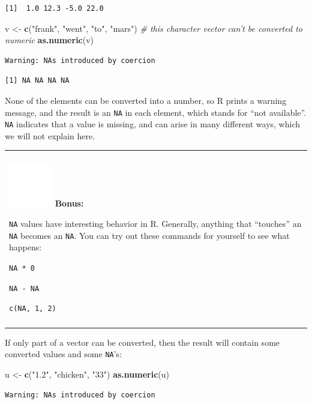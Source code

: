\documentclass[
]{book}
\newenvironment{Shaded}{\begin{snugshade}}{\end{snugshade}}
\newcommand{\CommentTok}[1]{\textcolor[rgb]{0.56,0.35,0.01}{\textit{#1}}}
\newcommand{\KeywordTok}[1]{\textcolor[rgb]{0.13,0.29,0.53}{\textbf{#1}}}
\newcommand{\NormalTok}[1]{#1}
\newcommand{\StringTok}[1]{\textcolor[rgb]{0.31,0.60,0.02}{#1}}
\newenvironment{bonus}
{
  \begin{center}
  \begin{tabular}{|>{\columncolor{bonus}\color{white}}p{0.9\textwidth}|}\hline\\
  \includegraphics[scale=0.1]{src/images/sun-fill-invert.png}
  \textbf{Bonus:}
}
{\\\\\hline
  \end{tabular}
  \end{center}
}
\begin{document}
\begin{verbatim}
[1]  1.0 12.3 -5.0 22.0
\end{verbatim}

\begin{Shaded}
\begin{Highlighting}[]
\NormalTok{v <-}\StringTok{ }\KeywordTok{c}\NormalTok{(}\StringTok{"frank"}\NormalTok{, }\StringTok{"went"}\NormalTok{, }\StringTok{"to"}\NormalTok{, }\StringTok{"mars"}\NormalTok{)   }\CommentTok{# this character vector can't be converted to numeric}
\KeywordTok{as.numeric}\NormalTok{(v)}
\end{Highlighting}
\end{Shaded}

\begin{verbatim}
Warning: NAs introduced by coercion
\end{verbatim}

\begin{verbatim}
[1] NA NA NA NA
\end{verbatim}

None of the elements can be converted into a number, so R prints a warning message, and the result is an \texttt{NA} in each element, which stands for ``not available''.
\texttt{NA} indicates that a value is missing, and can arise in many different ways, which we will not explain here.

\begin{bonus}
\texttt{NA} values have interesting behavior in R. Generally, anything
that ``touches'' an \texttt{NA} becomes an \texttt{NA}. You can try out
these commands for yourself to see what happens:

\texttt{NA\ *\ 0}

\texttt{NA\ -\ NA}

\texttt{c(NA,\ 1,\ 2)}
\end{bonus}

If only part of a vector can be converted, then the result will contain some converted values and some \texttt{NA}'s:

\begin{Shaded}
\begin{Highlighting}[]
\NormalTok{u <-}\StringTok{ }\KeywordTok{c}\NormalTok{(}\StringTok{"1.2"}\NormalTok{, }\StringTok{"chicken"}\NormalTok{, }\StringTok{"33"}\NormalTok{)}
\KeywordTok{as.numeric}\NormalTok{(u)}
\end{Highlighting}
\end{Shaded}

\begin{verbatim}
Warning: NAs introduced by coercion
\end{verbatim}
\end{document}
